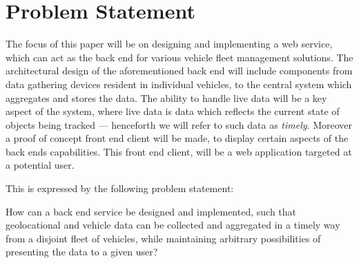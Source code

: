 \section{Problem Statement}\label{sec:section}

The focus of this paper will be on designing and implementing a web service,
which can act as the back end for various vehicle fleet management solutions.
The architectural design of the aforementioned back end will include components
from data gathering devices resident in individual vehicles,
to the central system which aggregates and stores the data.
The ability to handle live data will be a key aspect of the system,
where live data is data which reflects the current state of objects being tracked
--- henceforth we will refer to such data as \textit{timely}.
Moreover a proof of concept front end client will be made,
to display certain aspects of the back ends capabilities.
This front end client, will be a web application targeted at a potential user.

This is expressed by the following problem statement:

\medskip
{\addtolength{\leftskip}{10mm}\addtolength{\rightskip}{10mm}\noindent\hrulefill\it

\noindent How can a back end service be designed and implemented,
such that geolocational and vehicle data can be collected and aggregated in a timely way from a disjoint fleet of vehicles,
while maintaining arbitrary possibilities of presenting the data to a given user?

\noindent\hrulefill

}

